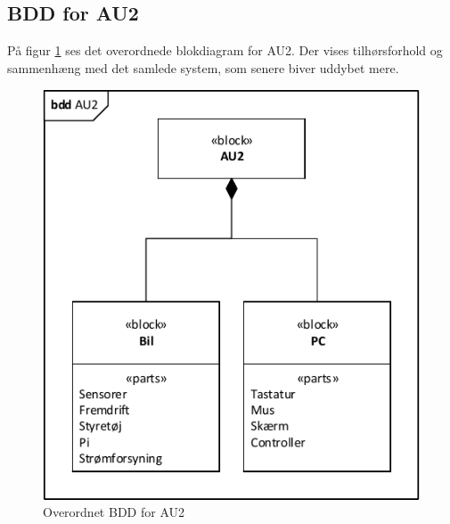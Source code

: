 \subsection{BDD for AU2}	%

På figur \ref{fig:bdd_au2} ses det overordnede blokdiagram for AU2. Der vises tilhørsforhold og sammenhæng med det samlede system, som senere biver uddybet mere.

\begin{figure}[h]
\centering
\includegraphics[scale=1]{../fig/diagrammer/bdd_au2.pdf}
\caption{Overordnet BDD for AU2}
\label{fig:bdd_au2}
\end{figure}